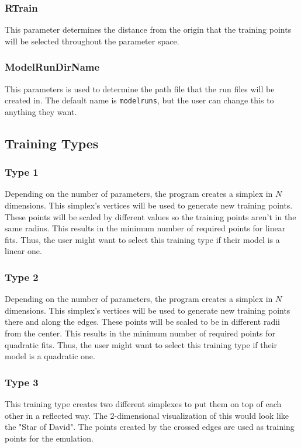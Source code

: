 \documentclass[12pt]{article}
\numberwithin{equation}{section}
\numberwithin{figure}{section}
\begin{document}
\subsubsection{RTrain}
This parameter determines the distance from the origin that the training points will be selected throughout the parameter space. 

\subsubsection{ModelRunDirName}
This parameters is used to determine the path file that the run files will be created in. The default name is {\tt{modelruns}}, but the user can change this to anything they want.

\subsection{Training Types}

\subsubsection{Type 1}
 Depending on the number of parameters, the program creates a simplex in $N$ dimensions. This simplex's vertices will be used to generate new training points. These points will be scaled by different values so the training points aren't in the same radius. This results in the minimum number of required points for linear fits. Thus, the user might want to select this training type if their model is a linear one.

\subsubsection{Type 2}

 Depending on the number of parameters, the program creates a simplex in $N$ dimensions. This simplex's vertices will be used to generate new training points there and along the edges. These points will be scaled to be in different radii from the center. This results in the minimum number of required points for quadratic fits. Thus, the user might want to select this training type if their model is a quadratic one.
 
\subsubsection{Type 3}
This training type creates two different simplexes to put them on top of each other in a reflected way. The 2-dimensional visualization of this would look like the "Star of David". The points created by the crossed edges are used as training points for the emulation.
 
\end{document}
